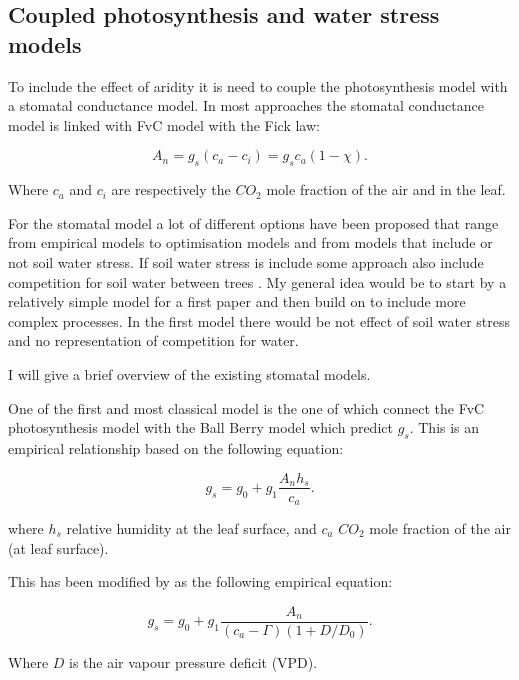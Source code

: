 \documentclass[a4paper,11pt]{article}
\begin{document}
\subsection{Coupled photosynthesis and water stress models}

To include the effect of aridity it is need to couple the photosynthesis model with a stomatal conductance model. In most approaches the stomatal conductance model is linked with FvC model with the Fick law:

\begin{equation}
\label{eq:fick}
A_n = g_s (c_a - c_i) = g_s c_a (1-\chi).
\end{equation}

Where $c_a$ and $c_i$ are respectively the $CO_2$ mole fraction of the air and in the leaf.


For the stomatal model a lot of different options have been proposed that range from empirical models to optimisation models and from models that include or not soil water stress. If soil water stress is include some approach also include competition for soil water between trees \citep{Farrior-2013}. My general idea would be to start by a relatively simple model for a first paper and then build on to include more complex processes. In the first model there would be not effect of soil water stress and no representation of competition for water.

I will give a brief overview of the existing stomatal models.

One of the first and most classical model is the one of \citet{Collatz-1991} which connect the FvC photosynthesis model with the Ball Berry model which predict $g_s$. This is an empirical relationship based on the following equation:

\begin{equation}
\label{eq:gs-Ball}
g_s= g_0 + g_1 \frac{A_n h_s}{c_a}.
\end{equation}

where $h_s$ relative humidity at the leaf surface, and $c_a$ $CO_2$ mole fraction of the air (at leaf surface).

This has been modified by \citet{Leuning-1995} as the following empirical equation:

\begin{equation}
\label{eq:gs-Leuning}
g_s= g_0 + g_1 \frac{A_n }{(c_a - \Gamma)(1+D/D_0)}.
\end{equation}

Where $D$ is the air vapour pressure deficit (VPD).
\end{document}
